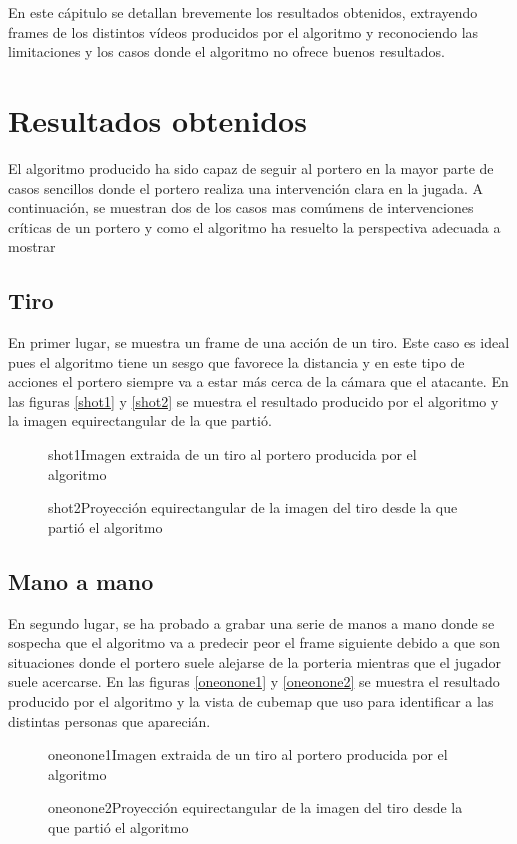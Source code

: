 En este cápitulo se detallan brevemente los resultados obtenidos, extrayendo frames de los distintos vídeos producidos por el algoritmo y reconociendo las limitaciones y los casos donde el algoritmo no ofrece buenos resultados.

\section{Resultados obtenidos}
El algoritmo producido ha sido capaz de seguir al portero en la mayor parte de casos sencillos donde el portero realiza una intervención clara en la jugada. A continuación, se muestran dos de los casos mas comúmens de intervenciones críticas de un portero y como el algoritmo ha resuelto la perspectiva adecuada a mostrar

\subsection{Tiro}
En primer lugar, se muestra un frame de una acción de un tiro. Este caso es ideal pues el algoritmo tiene un sesgo que favorece la distancia y en este tipo de acciones el portero siempre va a estar más cerca de la cámara que el atacante. En las figuras \ref{shot1} y \ref{shot2} se muestra el resultado producido por el algoritmo y la imagen equirectangular de la que partió.

\begin{figure}[shot1]{shot1}{Imagen extraida de un tiro al portero producida por el algoritmo}
\end{figure}

\begin{figure}[shot2]{shot2}{Proyección equirectangular de la imagen del tiro desde la que partió el algoritmo}
\end{figure}

\subsection{Mano a mano}
En segundo lugar, se ha probado a grabar una serie de manos a mano donde se sospecha que el algoritmo va a predecir peor el frame siguiente debido a que son situaciones donde el portero suele alejarse de la porteria mientras que el jugador suele acercarse. En las figuras \ref{oneonone1} y \ref{oneonone2} se muestra el resultado producido por el algoritmo y la vista de cubemap que uso para identificar a las distintas personas que aparecián.


\begin{figure}[oneonone1]{oneonone1}{Imagen extraida de un tiro al portero producida por el algoritmo}
\end{figure}

\begin{figure}[oneonone2]{oneonone2}{Proyección equirectangular de la imagen del tiro desde la que partió el algoritmo}
\end{figure}
